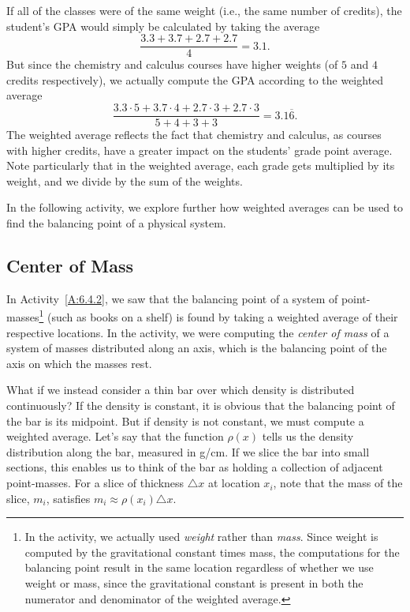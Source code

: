 If all of the classes were of the same weight (i.e., the same number of credits), the student's GPA would simply be calculated by taking the average
$$\frac{3.3 + 3.7 + 2.7 + 2.7}{4} = 3.1.$$
But since the chemistry and calculus courses have higher weights (of $5$ and $4$ credits respectively), we actually compute the GPA according to the weighted average 
$$\frac{3.3 \cdot 5 + 3.7 \cdot 4 + 2.7 \cdot 3 + 2.7 \cdot 3}{5 + 4 + 3 + 3} = 3.1\overline{6}.$$
The weighted average reflects the fact that chemistry and calculus, as courses with higher credits, have a greater impact on the students' grade point average.  Note particularly that in the weighted average, each grade gets multiplied by its weight, and we divide by the sum of the weights.

In the following activity, we explore further how weighted averages can be used to find the balancing point of a physical system.


\subsection*{Center of Mass} 

In Activity~\ref{A:6.4.2}, we saw that the balancing point of a system of point-masses\footnote{In the activity, we actually used \emph{weight} rather than \emph{mass}.  Since weight is computed by the gravitational constant times mass, the computations for the balancing point result in the same location regardless of whether we use weight or mass, since the gravitational constant is present in both the numerator and denominator of the weighted average.} (such as books on a shelf) is found by taking a weighted average of their respective locations.  In the activity, we were computing the \emph{center of mass} of a system of masses distributed along an axis, which is the balancing point of the axis on which the masses rest.


What if we instead consider a thin bar over which density is distributed continuously?  If the density is constant, it is obvious that the balancing point of the bar is its midpoint.  But if density is not constant, we must compute a weighted average.  Let's say that the function $\rho(x)$ tells us the density distribution along the bar, measured in g/cm.  If we slice the bar into small sections, this enables us to think of the bar as holding a collection of adjacent point-masses.  For a slice of thickness $\triangle x$ at location $x_i$, note that the mass of the slice, $m_i$, satisfies $m_i \approx \rho(x_i) \triangle x$.

